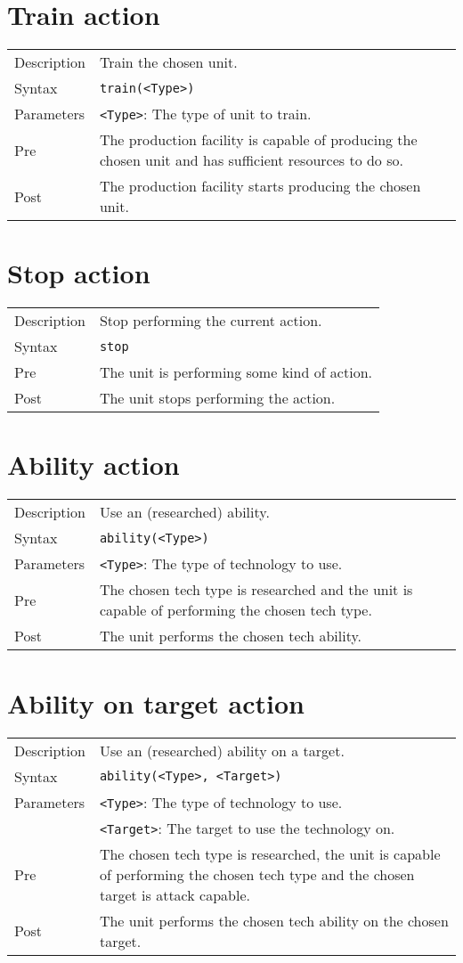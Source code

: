 \section{Train action}
\begin{tabularx}{\textwidth}{lX}
 Description & Train the chosen unit. \\
 Syntax & \verb|train(<Type>)| \\
 Parameters & \verb|<Type>|: The type of unit to train.\\
 Pre & The production facility is capable of producing the chosen unit and has sufficient resources to do so. \\
 Post & The production facility starts producing the chosen unit.
\end{tabularx}

\section{Stop action}
\begin{tabularx}{\textwidth}{lX}
 Description & Stop performing the current action. \\
 Syntax & \verb|stop| \\
 Pre & The unit is performing some kind of action. \\
 Post & The unit stops performing the action.
\end{tabularx}

\section{Ability action}
\begin{tabularx}{\textwidth}{lX}
 Description & Use an (researched) ability. \\
 Syntax & \verb|ability(<Type>)| \\
 Parameters & \verb|<Type>|: The type of technology to use.\\
 Pre & The chosen tech type is researched and the unit is capable of performing the chosen tech type. \\
 Post & The unit performs the chosen tech ability.
\end{tabularx}

\section{Ability on target action}
\begin{tabularx}{\textwidth}{lX}
 Description & Use an (researched) ability on a target. \\
 Syntax & \verb|ability(<Type>, <Target>)| \\
 Parameters & \verb|<Type>|: The type of technology to use.\\
            & \verb|<Target>|: The target to use the technology on.\\
 Pre & The chosen tech type is researched, the unit is capable of performing the chosen tech type and the chosen target is attack capable. \\
 Post & The unit performs the chosen tech ability on the chosen target.
\end{tabularx}

